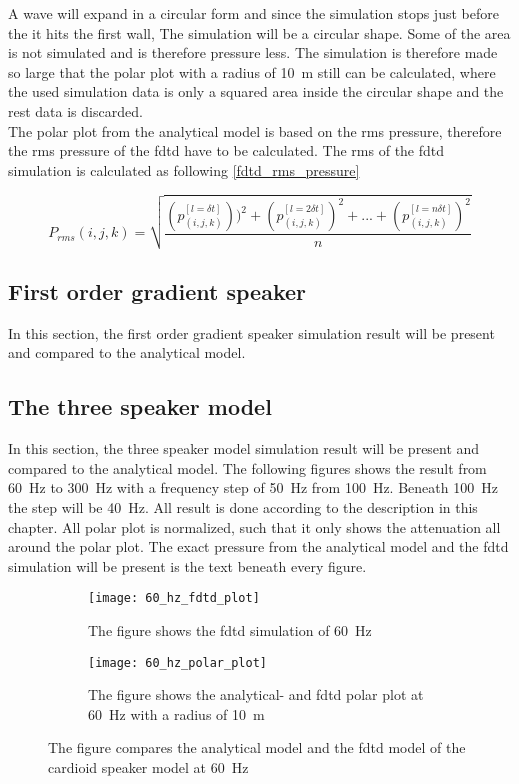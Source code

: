 A wave will expand in a circular form and since the simulation stops just before the it hits the first wall, The simulation will be a circular shape. Some of the area is not simulated and is therefore pressure less. The simulation is therefore made so large that the polar plot with a radius of \SI{10}{\meter} still can be calculated, where the used simulation data is only a squared area inside the circular shape and the rest data is discarded.\\

The polar plot from the analytical model is based on the \gls{rms} pressure, therefore the \gls{rms} pressure of the \gls{fdtd} have to be calculated. The \gls{rms} of the \gls{fdtd} simulation is calculated as following \autoref{fdtd_rms_pressure}

\begin{equation}\label{fdtd_rms_pressure}
P_{rms}(i,j,k)=\sqrt{\frac{\left(p_{(i,j,k)}^{[l= \delta t]} \right))^2 + \left(p_{(i,j,k)}^{[l= 2\delta t]}\right)^2 +...+\left(p_{(i,j,k)}^{[l= n\delta t]}\right)^2}{n}}
\end{equation}

\subsection{First order gradient speaker}
In this section, the first order gradient speaker simulation result will be present and compared to the analytical model.

\subsection{The three speaker model}
In this section, the three speaker model simulation result will be present and compared to the analytical model. The following figures shows the result from \SI{60}{\hertz} to \SI{300}{\hertz} with a frequency step of \SI{50}{\hertz} from \SI{100}{\hertz}. Beneath \SI{100}{\hertz} the step will be \SI{40}{\hertz}. All result is done according to the description in this chapter. All polar plot is normalized, such that it only shows the attenuation all around the polar plot. The exact pressure from the analytical model and the \gls{fdtd} simulation will be present is the text beneath every figure. 


\begin{figure}[H]
\centering
\begin{subfigure}[htbp]{0.55\textwidth}
		\texttt{[image: 60\_hz\_fdtd\_plot]}
		\caption{The figure shows the \gls{fdtd} simulation of \SI{60}{\hertz}}
		\label{fig:fdtd_60_Hz}
\end{subfigure}
\begin{subfigure}[htbp]{0.35\textwidth}
		\texttt{[image: 60\_hz\_polar\_plot]}
		\caption{The figure shows the analytical- and \gls{fdtd} polar plot at \SI{60}{\hertz} with a radius of \SI{10}{\meter}}
		\label{fig:polar_60_Hz}
\end{subfigure} 
\caption{The figure compares the analytical model and the \gls{fdtd} model of the cardioid speaker model at \SI{60}{\hertz}}
\end{figure}


